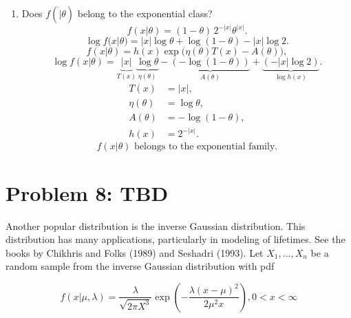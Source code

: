 \documentclass{article}
\begin{document}
\begin{enumerate}
	\item Does $f(\dot|\theta)$ belong to the exponential class?
	      \[
		      f(x|\theta) = (1-\theta)\, 2^{-|x|} \theta^{|x|}.
	      \]
	      \[
		      \log f(x|\theta) = |x| \log \theta + \log(1-\theta) - |x| \log 2.
	      \]
	      \[
		      f(x|\theta) = h(x) \exp\big( \eta(\theta) T(x) - A(\theta) \big),
	      \]
	      \[
		      \log f(x|\theta) = \underbrace{|x|}_{T(x)} \underbrace{\log \theta}_{\eta(\theta)} - \underbrace{(-\log(1-\theta))}_{A(\theta)} + \underbrace{(-|x| \log 2)}_{\log h(x)}.
	      \]
	      \[
		      \begin{aligned}
			      T(x)         & = |x|,             \\
			      \eta(\theta) & = \log \theta,     \\
			      A(\theta)    & = -\log(1-\theta), \\
			      h(x)         & = 2^{-|x|}.
		      \end{aligned}
	      \]
	      \[
		      \boxed{f(x|\theta) \text{ belongs to the exponential family.}}
	      \]
\end{enumerate}

\section*{Problem 8: TBD}

Another popular distribution is the inverse Gaussian distribution. This distribution has
many applications, particularly in modeling of lifetimes. See the books by Chikhris and
Folks (1989) and Seshadri (1993). Let $X_1, \ldots , X_n$ be a random sample from the inverse
Gaussian distribution with pdf

$$
	f(x|\mu, \lambda) = \frac{\lambda}{\sqrt{2\pi X^3}}\exp{\left( -\frac{\lambda(x-\mu)^2}{2 \mu^2x} \right)}, 0 < x < \infty
$$
\end{document}
